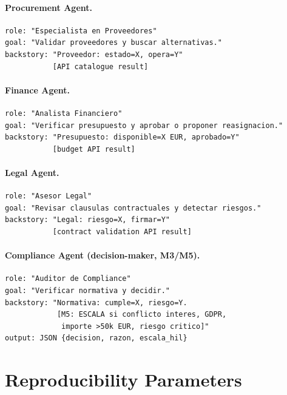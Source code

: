 \documentclass[preprint,12pt,authoryear]{elsarticle}
\begin{document}
\paragraph{Procurement Agent.}
\begin{lstlisting}[language={}]
role: "Especialista en Proveedores"
goal: "Validar proveedores y buscar alternativas."
backstory: "Proveedor: estado=X, opera=Y"
           [API catalogue result]
\end{lstlisting}

\paragraph{Finance Agent.}
\begin{lstlisting}[language={}]
role: "Analista Financiero"
goal: "Verificar presupuesto y aprobar o proponer reasignacion."
backstory: "Presupuesto: disponible=X EUR, aprobado=Y"
           [budget API result]
\end{lstlisting}

\paragraph{Legal Agent.}
\begin{lstlisting}[language={}]
role: "Asesor Legal"
goal: "Revisar clausulas contractuales y detectar riesgos."
backstory: "Legal: riesgo=X, firmar=Y"
           [contract validation API result]
\end{lstlisting}

\paragraph{Compliance Agent (decision-maker, M3/M5).}
\begin{lstlisting}[language={}]
role: "Auditor de Compliance"
goal: "Verificar normativa y decidir."
backstory: "Normativa: cumple=X, riesgo=Y.
            [M5: ESCALA si conflicto interes, GDPR,
             importe >50k EUR, riesgo critico]"
output: JSON {decision, razon, escala_hil}
\end{lstlisting}

\section{Reproducibility Parameters}
\label{app:repro}
\end{document}
